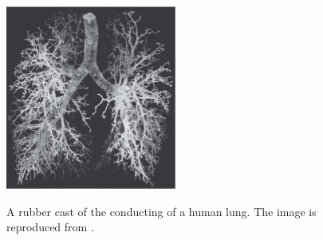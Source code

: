 %
\begin{figure}[H]
  \centering
{\label{fig:mouse}\includegraphics[width=0.5\textwidth]{figures/images/lung_west.pdf}}                
  \label{fig:acinar_units}
\caption{A rubber cast of the conducting of a human lung. The image is reproduced from \cite{west2008respiratory}.}
\label{fig:rubber_tree}
\end{figure}

